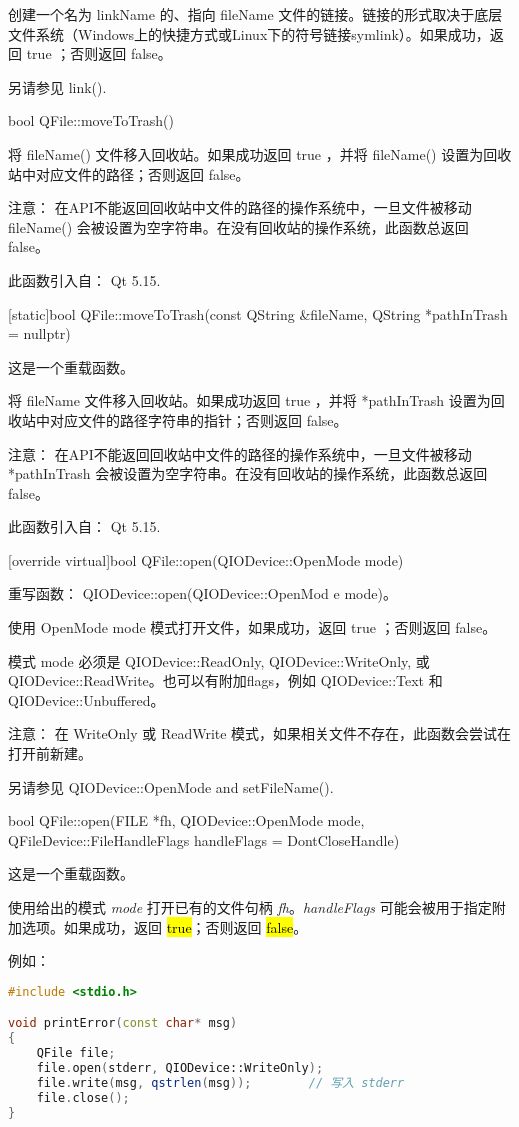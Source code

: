 创建一个名为 linkName 的、指向 fileName 文件的链接。链接的形式取决于底层文件系统（Windows上的快捷方式或Linux下的符号链接symlink）。如果成功，返回 true ；否则返回 false。

另请参见 link().

bool QFile::moveToTrash()

将 fileName() 文件移入回收站。如果成功返回 true ，并将 fileName() 设置为回收站中对应文件的路径；否则返回 false。

注意： 在API不能返回回收站中文件的路径的操作系统中，一旦文件被移动 fileName() 会被设置为空字符串。在没有回收站的操作系统，此函数总返回 false。

此函数引入自： Qt 5.15.

[static]bool QFile::moveToTrash(const QString \&fileName, QString *pathInTrash = nullptr)

这是一个重载函数。

将 fileName 文件移入回收站。如果成功返回 true ，并将 *pathInTrash 设置为回收站中对应文件的路径字符串的指针；否则返回 false。

注意： 在API不能返回回收站中文件的路径的操作系统中，一旦文件被移动 *pathInTrash 会被设置为空字符串。在没有回收站的操作系统，此函数总返回 false。

此函数引入自： Qt 5.15.

[override virtual]bool QFile::open(QIODevice::OpenMode mode)

重写函数： QIODevice::open(QIODevice::OpenMod
e mode)。

使用 OpenMode mode 模式打开文件，如果成功，返回 true ；否则返回 false。

模式 mode 必须是 QIODevice::ReadOnly, QIODevice::WriteOnly, 或 QIODevice::ReadWrite。也可以有附加flags，例如 QIODevice::Text 和 QIODevice::Unbuffered。

注意： 在 WriteOnly 或 ReadWrite 模式，如果相关文件不存在，此函数会尝试在打开前新建。

另请参见 QIODevice::OpenMode and setFileName().

bool QFile::open(FILE *fh, QIODevice::OpenMode mode, QFileDevice::FileHandleFlags handleFlags = DontCloseHandle)

这是一个重载函数。

使用给出的模式 \emph{mode} 打开已有的文件句柄 \emph{fh}。\emph{handleFlags} 可能会被用于指定附加选项。如果成功，返回 \hl{true}；否则返回 \hl{false}。

例如：


\begin{lstlisting}[language=C++]
#include <stdio.h>

void printError(const char* msg)
{
    QFile file;
    file.open(stderr, QIODevice::WriteOnly);
    file.write(msg, qstrlen(msg));        // 写入 stderr
    file.close();
}
\end{lstlisting}

